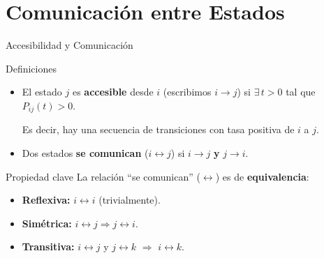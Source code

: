 \documentclass[aspectratio=1610, 10pt]{beamer}
\begin{document}
\section{Comunicaci\'{o}n entre Estados}

\begin{frame}{Accesibilidad y Comunicaci\'{o}n}
  \begin{block}{Definiciones}
    \begin{itemize}
      \item El estado $j$ es \textbf{accesible} desde $i$ (escribimos $i \to j$) si
            $\exists\, t > 0$ tal que $P_{ij}(t) > 0$.

            Es decir, hay una secuencia de transiciones con tasa positiva de $i$ a $j$.
      \item Dos estados \textbf{se comunican} ($i \leftrightarrow j$) si $i \to j$ \textbf{y} $j \to i$.
    \end{itemize}
  \end{block}

  \vspace{4pt}
  \begin{exampleblock}{Propiedad clave}
    La relaci\'{o}n ``se comunican'' ($\leftrightarrow$) es de \textbf{equivalencia}:
    \begin{itemize}
      \item \textbf{Reflexiva:} $i \leftrightarrow i$ (trivialmente).
      \item \textbf{Sim\'{e}trica:} $i \leftrightarrow j \Rightarrow j \leftrightarrow i$.
      \item \textbf{Transitiva:} $i \leftrightarrow j$ y $j \leftrightarrow k$ $\Rightarrow$ $i \leftrightarrow k$.
    \end{itemize}
  \end{exampleblock}
\end{frame}
\end{document}
